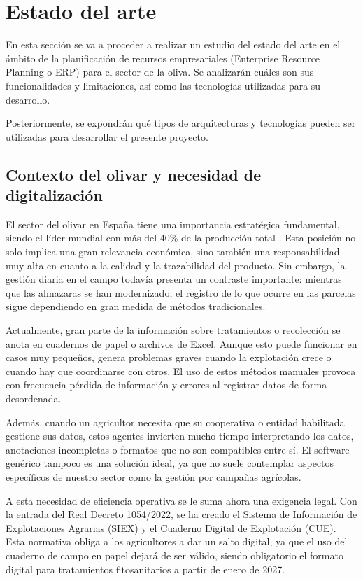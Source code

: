 \chapter{Estado del arte}\label{cap:estado}

En esta sección se va a proceder a realizar un estudio del estado del arte en el ámbito de la planificación de 
recursos empresariales (Enterprise Resource Planning o ERP) para el sector de la oliva. Se analizarán cuáles 
son sus funcionalidades y limitaciones, así como las tecnologías utilizadas para su desarrollo.

Posteriormente, se expondrán qué tipos de arquitecturas y tecnologías pueden ser utilizadas para desarrollar el presente proyecto.

\section{Contexto del olivar y necesidad de digitalización}

El sector del olivar en España tiene una importancia estratégica fundamental, siendo el líder mundial con más del 40\% de la producción total \cite{principalesProductoresAceiteOliva}. Esta posición no solo implica 
una gran relevancia económica, sino también una responsabilidad muy alta en cuanto a la calidad y la trazabilidad del producto. Sin embargo, la gestión diaria en el campo 
todavía presenta un contraste importante: mientras que las almazaras se han modernizado, el registro de lo que ocurre en las parcelas sigue dependiendo en gran medida de 
métodos tradicionales.

Actualmente, gran parte de la información sobre tratamientos o recolección se anota en cuadernos de papel o archivos de Excel. Aunque esto puede funcionar en casos muy pequeños, 
genera problemas graves cuando la explotación crece o cuando hay que coordinarse con otros. El uso de estos métodos manuales provoca con frecuencia pérdida de información y 
errores al registrar datos de forma desordenada.

Además, cuando un agricultor necesita que su cooperativa o entidad habilitada gestione sus datos, estos agentes invierten mucho tiempo interpretando los datos, anotaciones incompletas 
o formatos que no son compatibles entre sí. El software genérico tampoco es una solución ideal, ya que no suele contemplar aspectos específicos de nuestro sector como la gestión por 
campañas agrícolas. 

A esta necesidad de eficiencia operativa se le suma ahora una exigencia legal. Con la entrada del Real Decreto 1054/2022, se ha creado el Sistema de Información de Explotaciones Agrarias 
(SIEX) y el Cuaderno Digital de Explotación (CUE). Esta normativa obliga a los agricultores a dar un salto digital, ya que el uso del cuaderno de campo en papel dejará de ser válido, 
siendo obligatorio el formato digital para tratamientos fitosanitarios a partir de enero de 2027.

